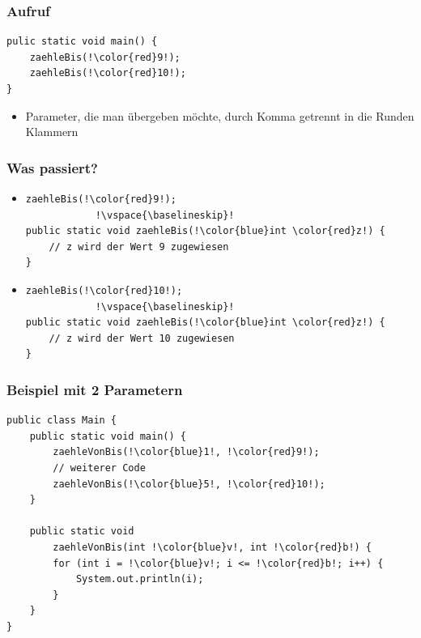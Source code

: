\documentclass[final]{beamer}
\begin{document}
\begin{frame}[containsverbatim]
	\frametitle{Aufruf}
	\begin{lstlisting}[escapechar=!]
pulic static void main() {
	zaehleBis(!\color{red}9!);
	zaehleBis(!\color{red}10!);
}
	\end{lstlisting}
	\begin{itemize}
		\item{Parameter, die man übergeben möchte, durch Komma getrennt in die Runden Klammern}
	\end{itemize}
\end{frame}

\begin{frame}[containsverbatim]
	\frametitle{Was passiert?}
	\begin{itemize}
		\item{
			\begin{lstlisting}[escapechar=!]
zaehleBis(!\color{red}9!);
			!\vspace{\baselineskip}!
public static void zaehleBis(!\color{blue}int \color{red}z!) {
	// z wird der Wert 9 zugewiesen
}
			\end{lstlisting}
		}
		\vspace{\baselineskip}
		\item{
			\begin{lstlisting}[escapechar=!]
zaehleBis(!\color{red}10!);
			!\vspace{\baselineskip}!
public static void zaehleBis(!\color{blue}int \color{red}z!) {
	// z wird der Wert 10 zugewiesen
}
			\end{lstlisting}
		}
	\end{itemize}
\end{frame}

\begin{frame}[containsverbatim]
	\frametitle{Beispiel mit 2 Parametern}
	\begin{lstlisting}[escapechar=!]
public class Main {
	public static void main() {
		zaehleVonBis(!\color{blue}1!, !\color{red}9!);
		// weiterer Code
		zaehleVonBis(!\color{blue}5!, !\color{red}10!);
	}
	
	public static void 
		zaehleVonBis(int !\color{blue}v!, int !\color{red}b!) {
		for (int i = !\color{blue}v!; i <= !\color{red}b!; i++) {
			System.out.println(i);
		}
	}
}
	\end{lstlisting}
\end{frame}
\end{document}
